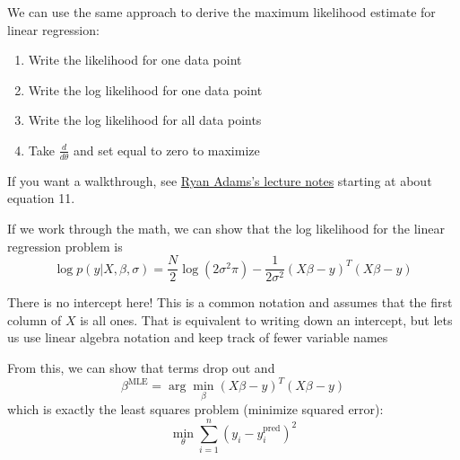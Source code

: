 \documentclass[
  letterpaper,
  DIV=11,
  numbers=noendperiod]{scrreprt}
\providecommand{\tightlist}{%
  \setlength{\itemsep}{0pt}\setlength{\parskip}{0pt}}
\begin{document}
We can use the same approach to derive the maximum likelihood estimate
for linear regression:

\begin{enumerate}
\def\labelenumi{\arabic{enumi}.}
\tightlist
\item
  Write the likelihood for one data point
\item
  Write the log likelihood for one data point
\item
  Write the log likelihood for all data points
\item
  Take \(\frac{d}{d\theta}\) and set equal to zero to maximize
\end{enumerate}

If you want a walkthrough, see
\href{https://www.cs.princeton.edu/courses/archive/fall18/cos324/files/mle-regression.pdf}{Ryan
Adams's lecture notes} starting at about equation 11.

If we work through the math, we can show that the log likelihood for the
linear regression problem is \[
\log p(y | X, \beta, \sigma) = \frac{N}{2} \log (2 \sigma^2 \pi)  - \frac{1}{2 \sigma^2} \left( X \beta - y \right)^T \left( X \beta - y \right)
\]

\begin{tcolorbox}[enhanced jigsaw, arc=.35mm, breakable, title=\textcolor{quarto-callout-note-color}{\faInfo}\hspace{0.5em}{Linear algebra notation}, coltitle=black, opacityback=0, bottomtitle=1mm, colback=white, left=2mm, opacitybacktitle=0.6, toptitle=1mm, colframe=quarto-callout-note-color-frame, leftrule=.75mm, titlerule=0mm, rightrule=.15mm, bottomrule=.15mm, colbacktitle=quarto-callout-note-color!10!white, toprule=.15mm]

There is no intercept here! This is a common notation and assumes that
the first column of \(X\) is all ones. That is equivalent to writing
down an intercept, but lets us use linear algebra notation and keep
track of fewer variable names

\end{tcolorbox}

From this, we can show that terms drop out and \[
\beta^\text{MLE} = \arg \min_\beta \left( X \beta - y \right)^T \left( X \beta - y \right)
\] which is exactly the least squares problem (minimize squared error):
\[
\min_{\theta} \sum_{i=1}^n (y_i - y_i^\text{pred})^2
\]
\end{document}
